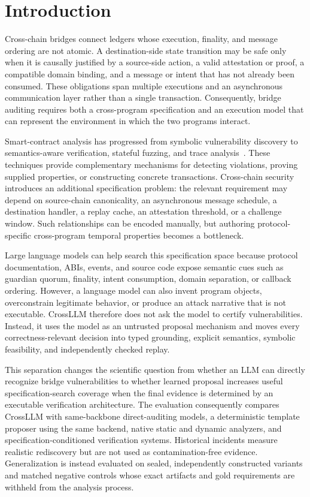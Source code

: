 \documentclass[journal]{IEEEtran}
\theoremstyle{definition}
\begin{document}
\section{Introduction}
\label{sec:introduction}

Cross-chain bridges connect ledgers whose execution, finality, and message ordering are not atomic. A destination-side state transition may be safe only when it is causally justified by a source-side action, a valid attestation or proof, a compatible domain binding, and a message or intent that has not already been consumed. These obligations span multiple executions and an asynchronous communication layer rather than a single transaction. Consequently, bridge auditing requires both a cross-program specification and an execution model that can represent the environment in which the two programs interact.

Smart-contract analysis has progressed from symbolic vulnerability discovery to semantics-aware verification, stateful fuzzing, and trace analysis~\cite{luu2016making,tsankov2018securify,permenev2020verx,frank2020ethbmc,choi2021smartian,shou2023ityfuzz}. These techniques provide complementary mechanisms for detecting violations, proving supplied properties, or constructing concrete transactions. Cross-chain security introduces an additional specification problem: the relevant requirement may depend on source-chain canonicality, an asynchronous message schedule, a destination handler, a replay cache, an attestation threshold, or a challenge window. Such relationships can be encoded manually, but authoring protocol-specific cross-program temporal properties becomes a bottleneck.

Large language models can help search this specification space because protocol documentation, ABIs, events, and source code expose semantic cues such as guardian quorum, finality, intent consumption, domain separation, or callback ordering. However, a language model can also invent program objects, overconstrain legitimate behavior, or produce an attack narrative that is not executable. CrossLLM therefore does not ask the model to certify vulnerabilities. Instead, it uses the model as an untrusted proposal mechanism and moves every correctness-relevant decision into typed grounding, explicit semantics, symbolic feasibility, and independently checked replay.

This separation changes the scientific question from whether an LLM can directly recognize bridge vulnerabilities to whether learned proposal increases useful specification-search coverage when the final evidence is determined by an executable verification architecture. The evaluation consequently compares CrossLLM with same-backbone direct-auditing models, a deterministic template proposer using the same backend, native static and dynamic analyzers, and specification-conditioned verification systems. Historical incidents measure realistic rediscovery but are not used as contamination-free evidence. Generalization is instead evaluated on sealed, independently constructed variants and matched negative controls whose exact artifacts and gold requirements are withheld from the analysis process.
\end{document}
